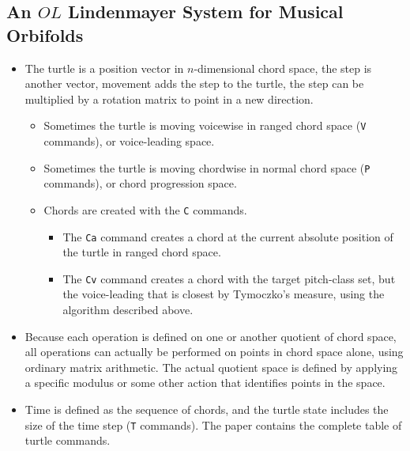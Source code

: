 \documentclass[14pt,letterpaper,onecolumn]{scrartcl}
\begin{document}
\subsection{An $OL$ Lindenmayer System for Musical Orbifolds}

\begin{itemize}

\item The turtle is a position vector in $n$-dimensional chord space, the step is another vector, movement adds the step to the turtle, the step can be multiplied by a rotation matrix to point in a new direction. 

\begin{itemize}

\item Sometimes the turtle is moving voicewise in ranged chord space (\texttt{V} commands), or voice-leading space.

\item Sometimes the turtle is moving chordwise in normal chord space (\texttt{P} commands), or chord progression space. 

\item Chords are created with the \texttt{C} commands. 

\begin{itemize}

\item The \texttt{Ca} command creates a chord at the current absolute position of the turtle in ranged chord space. 

\item The \texttt{Cv} command creates a chord with the target pitch-class set, but the voice-leading that is closest by Tymoczko's measure, using the algorithm described above.

\end{itemize}

\end{itemize} 

\item Because each operation is defined on one or another quotient of chord space, all operations can actually be performed on points in chord space alone, using ordinary matrix arithmetic. The actual quotient space is defined by applying a specific modulus or some other action that identifies points in the space. 

\item Time is defined as the sequence of chords, and the turtle state includes the size of the time step (\texttt{T} commands). The paper contains the complete table of turtle commands.

\end{itemize}
\end{document}
